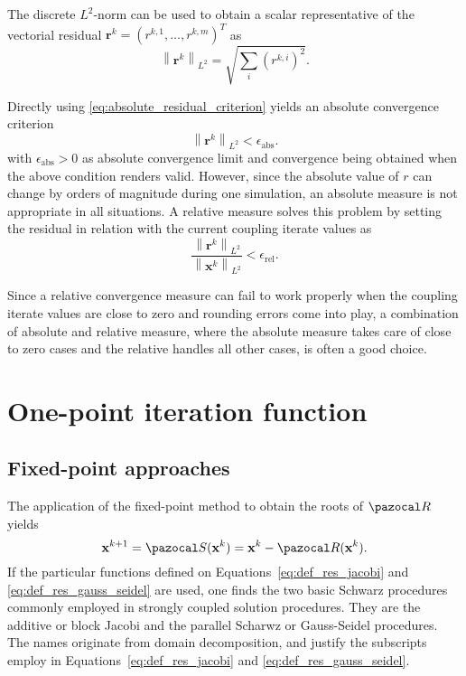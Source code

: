 The discrete  $L^{2}$-norm can be used to obtain a scalar representative of the vectorial residual \(\mathbf r^{k}=\left(r^{k,1}, \ldots, r^{k,m}\right)^{T}\) as
\begin{equation} \label{eq:absolute_residual_criterion}
\left\|\mathbf{r}^{k}\right\|_{L^{2}}=\sqrt{\sum_{i}\left(r^{k, i}\right)^{2}}.
\end{equation}

Directly using \eqref{eq:absolute_residual_criterion} yields an absolute convergence criterion
\begin{equation}
\left\|\boldsymbol{r} ^{k}\right\|_{L^{2}}<\epsilon_\mathrm{abs}.
\end{equation}
with $\epsilon_\mathrm{abs}>0$ as absolute convergence limit and convergence being obtained when the above condition renders valid.
However, since the absolute value of $r$ can change by orders of magnitude during one simulation, an absolute measure is not appropriate in all situations.
A relative measure solves this problem by setting the residual in relation with the current coupling iterate values as
\begin{equation}
\frac{\left\|\mathbf{r}^{k}\right\|_{L^{2}}}{\left\|\mathbf{x}^{k}\right\|_{L^{2}}}<\epsilon_\mathrm{rel}.
\end{equation}

Since a relative convergence measure can fail to work properly when the coupling iterate values are close to zero and rounding errors come into play, a combination of absolute and relative measure, where the absolute measure takes care of close to zero cases and the relative handles all other cases, is often a good choice.



\section{One-point iteration function}


\subsection{Fixed-point approaches}

The application of the fixed-point method to obtain the roots of \(\pazocal R\) yields
\begin{equation}
  \mathbf x^{k+1} = \pazocal S(\mathbf x^k) = \mathbf x^k - \pazocal R(\mathbf x^k).
\end{equation}
If the particular functions defined on Equations~\eqref{eq:def_res_jacobi} and \eqref{eq:def_res_gauss_seidel} are used, one finds the  two basic Schwarz procedures commonly employed in strongly coupled solution procedures.
They are the additive or block Jacobi and the parallel Scharwz or Gauss-Seidel procedures.
The names originate from domain decomposition, and justify the subscripts employ in Equations~\eqref{eq:def_res_jacobi} and \eqref{eq:def_res_gauss_seidel}.


